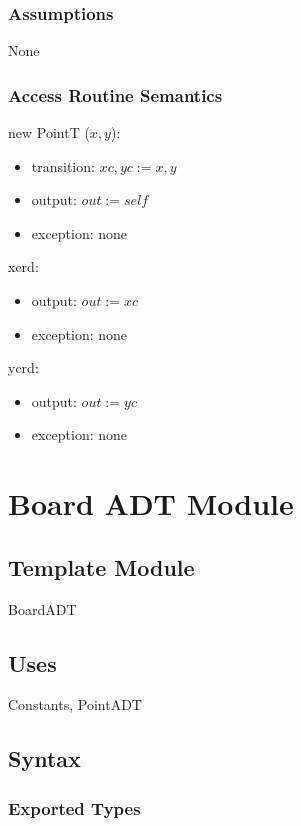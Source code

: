 \documentclass[12pt]{article}
\begin{document}
\subsubsection* {Assumptions}
None

\subsubsection* {Access Routine Semantics}

new PointT ($x, y$):
\begin{itemize}
\item transition: $xc, yc := x, y$
\item output: $out := \mathit{self}$
\item exception: none
\end{itemize}

\noindent xcrd:
\begin{itemize}
\item output: $out := xc$
\item exception: none
\end{itemize}

\noindent ycrd:
\begin{itemize}
\item output: $out := yc$
\item exception: none
\end{itemize}

\newpage

\section* {Board ADT Module}

\subsection*{Template Module}

BoardADT

\subsection* {Uses}

Constants, PointADT

\subsection* {Syntax}

\subsubsection* {Exported Types}
\end{document}
